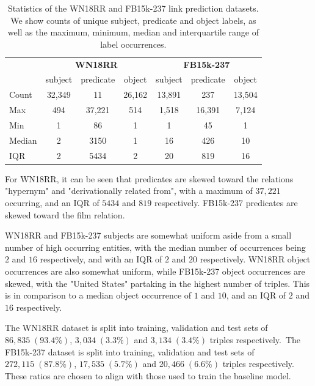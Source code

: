 \begin{table}[H]
	\begin{center}
	\begin{tabular}{|l|ccc|ccc|}
		\hline
 		& \multicolumn{3}{c|}{\textbf{WN18RR}} & \multicolumn{3}{c|}{\textbf{FB15k-237}} \\
		& subject & predicate & object & subject & predicate & object \\
		\hline 
		Count & 32,349 & 11 & 26,162 & 13,891 & 237 & 13,504 \\
		Max & 494 & 37,221 & 514 & 1,518 & 16,391 & 7,124 \\
		Min & 1 & 86 & 1 & 1 & 45 & 1 \\
		Median & 2 & 3150 & 1 & 16 & 426 & 10 \\
		IQR & 2 & 5434 & 2 & 20 & 819 & 16 \\
		\hline 
	\end{tabular}
	\end{center}
	\captionsetup{justification=centering}
	\caption{Statistics of the WN18RR and FB15k-237 link prediction datasets. We show counts of unique subject, predicate and object labels, as well as the maximum, minimum, median and interquartile range of label occurrences.}
\end{table}

\noindent For WN18RR, it can be seen that predicates are skewed toward the relations "hypernym" and "derivationally related from", with a maximum of $ 37, 221 $ occurring, and an IQR of $ 5434 $ and $ 819 $ respectively. FB15k-237 predicates are skewed toward the film relation. \par

\noindent WN18RR and FB15k-237 subjects are somewhat uniform aside from a small number of high occurring entities, with the median number of occurrences being $ 2 $ and $ 16 $ respectively, and with an IQR of $ 2 $ and $ 20 $ respectively. WN18RR object occurrences are also somewhat uniform, while FB15k-237 object occurrences are skewed, with the "United States" partaking in the highest number of triples. This is in comparison to a median object occurrence of $ 1 $ and $ 10 $, and an IQR of $ 2 $ and $ 16 $ respectively. \par

\noindent The WN18RR dataset is split into training, validation and test sets of $ 86, 835 \; (93.4 \%) $, $ 3, 034 \; (3.3 \%) $ and $ 3, 134\; (3.4 \%) $ triples respectively.\ The FB15k-237 dataset is split into training, validation and test sets of $ 272, 115 \; (87.8 \%) $, $ 17, 535 \; (5.7 \%) $ and $ 20, 466 \; (6.6 \%) $ triples respectively. These ratios are chosen to align with those used to train the baseline model.

